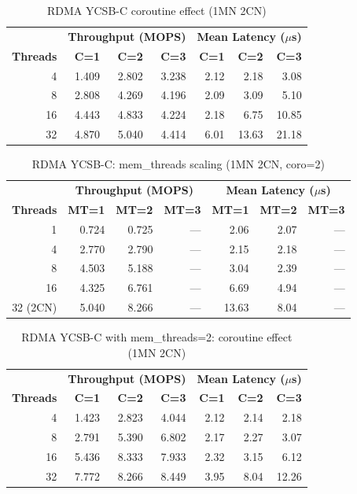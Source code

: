 \documentclass[conference]{IEEEtran}
\begin{document}
\begin{table}[H]
\centering
\caption{RDMA YCSB-C coroutine effect (1MN 2CN)}
\label{tab:rdma-coro-2cn}
\scriptsize
\begin{tabular}{@{}rrrr|rrr@{}}
\toprule
& \multicolumn{3}{c|}{\textbf{Throughput (MOPS)}} & \multicolumn{3}{c}{\textbf{Mean Latency ($\mu$s)}} \\
\textbf{Threads} & \textbf{C=1} & \textbf{C=2} & \textbf{C=3} & \textbf{C=1} & \textbf{C=2} & \textbf{C=3} \\
\midrule
4  & 1.409 & 2.802 & 3.238 & 2.12 & 2.18 & 3.08 \\
8  & 2.808 & 4.269 & 4.196 & 2.09 & 3.09 & 5.10 \\
16 & 4.443 & 4.833 & 4.224 & 2.18 & 6.75 & 10.85 \\
32 & 4.870 & 5.040 & 4.414 & 6.01 & 13.63 & 21.18 \\
\bottomrule
\end{tabular}
\end{table}

\begin{table}[H]
\centering
\caption{RDMA YCSB-C: mem\_threads scaling (1MN 2CN, coro=2)}
\label{tab:rdma-memthreads}
\scriptsize
\begin{tabular}{@{}rrrr|rrr@{}}
\toprule
& \multicolumn{3}{c|}{\textbf{Throughput (MOPS)}} & \multicolumn{3}{c}{\textbf{Mean Latency ($\mu$s)}} \\
\textbf{Threads} & \textbf{MT=1} & \textbf{MT=2} & \textbf{MT=3} & \textbf{MT=1} & \textbf{MT=2} & \textbf{MT=3} \\
\midrule
1  & 0.724  & 0.725  & ---    & 2.06  & 2.07  & --- \\
4  & 2.770  & 2.790  & ---    & 2.15  & 2.18  & --- \\
8  & 4.503  & 5.188  & ---    & 3.04  & 2.39  & --- \\
16 & 4.325  & 6.761  & ---    & 6.69  & 4.94  & --- \\
32 (2CN) & 5.040 & 8.266 & --- & 13.63 & 8.04 & --- \\
\bottomrule
\end{tabular}
\end{table}

\begin{table}[H]
\centering
\caption{RDMA YCSB-C with mem\_threads=2: coroutine effect (1MN 2CN)}
\label{tab:rdma-mt2-coro}
\scriptsize
\begin{tabular}{@{}rrrr|rrr@{}}
\toprule
& \multicolumn{3}{c|}{\textbf{Throughput (MOPS)}} & \multicolumn{3}{c}{\textbf{Mean Latency ($\mu$s)}} \\
\textbf{Threads} & \textbf{C=1} & \textbf{C=2} & \textbf{C=3} & \textbf{C=1} & \textbf{C=2} & \textbf{C=3} \\
\midrule
4  & 1.423 & 2.823 & 4.044 & 2.12 & 2.14 & 2.18 \\
8  & 2.791 & 5.390 & 6.802 & 2.17 & 2.27 & 3.07 \\
16 & 5.436 & 8.333 & 7.933 & 2.32 & 3.15 & 6.12 \\
32 & 7.772 & 8.266 & 8.449 & 3.95 & 8.04 & 12.26 \\
\bottomrule
\end{tabular}
\end{table}
\end{document}
